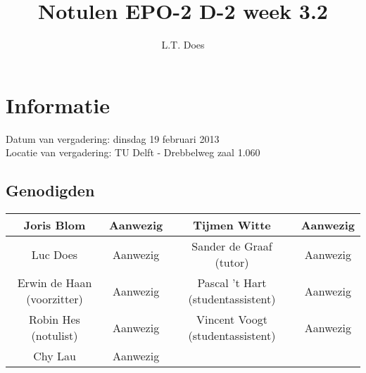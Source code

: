\documentclass{article}
\begin{document}
\title{Notulen EPO-2 D-2 week 3.2}
\author{L.T. Does}
\maketitle
\section*{Informatie}
Datum van vergadering: dinsdag 19 februari 2013\\ %
Locatie van vergadering: TU Delft - Drebbelweg zaal 1.060 %
\subsection*{Genodigden}
\begin{center}
\begin{tabular}{|c |c |c |c |}
	\hline
	Joris Blom & Aanwezig & Tijmen Witte & Aanwezig \\
	\hline
	Luc Does & Aanwezig & Sander de Graaf (tutor) & Aanwezig \\
	\hline
	Erwin de Haan (voorzitter) & Aanwezig & Pascal 't Hart (studentassistent) & Aanwezig \\
	\hline
	Robin Hes (notulist) & Aanwezig & Vincent Voogt (studentassistent) & Aanwezig \\
	\hline
	Chy Lau & Aanwezig & & \\
	\hline
\end{tabular}
\end{center}
\end{document}
